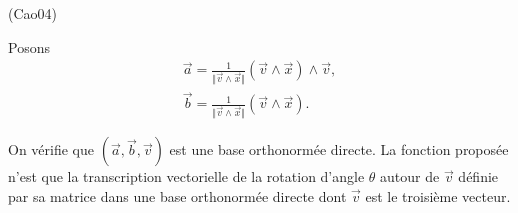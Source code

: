 \begin{tiny}(Cao04)\end{tiny} Posons 
\begin{multline*}
 \overrightarrow{a} 
 = \frac{1}{\Vert \overrightarrow{v} \wedge \overrightarrow{x}\Vert}\left( \overrightarrow{v} \wedge \overrightarrow{x}\right) \wedge \overrightarrow{v}, \\
 \overrightarrow{b} 
 = \frac{1}{\Vert \overrightarrow{v} \wedge \overrightarrow{x}\Vert}\left( \overrightarrow{v} \wedge \overrightarrow{x}\right).
\end{multline*}

On vérifie que 
$(\overrightarrow{a} , \overrightarrow{b} , \overrightarrow{v})$ est une base orthonormée directe. La fonction proposée n'est que la transcription vectorielle de la rotation d'angle $\theta$ autour de $\overrightarrow{v}$ définie par sa matrice dans une base orthonormée directe dont $\overrightarrow{v}$ est le troisième vecteur. 
